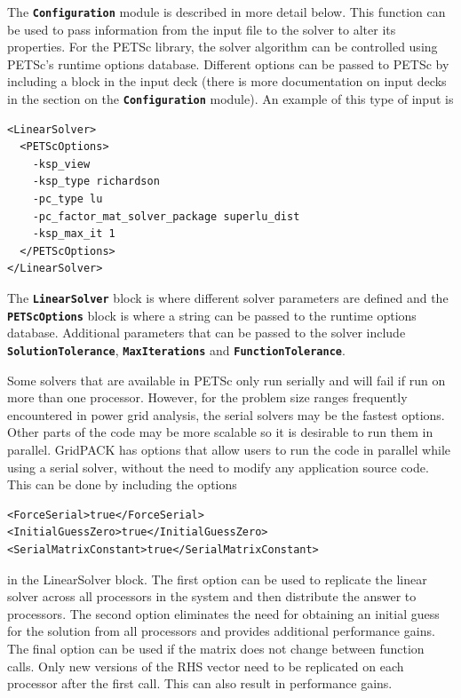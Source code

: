 \documentclass[12pt]{report} %
\begin{document}
The \texttt{\textbf{Configuration}} module is described in more detail below. This function can be used to pass information from the input file to the solver to alter its properties. For the PETSc library, the solver algorithm can be controlled using PETSc's runtime options database. Different options can be passed to PETSc by including a block in the input deck (there is more documentation on input decks in the section on the \texttt{\textbf{Configuration}} module). An example of this type of input is

{
\color{blue}
\begin{Verbatim}[fontseries=b]
<LinearSolver>
  <PETScOptions>
    -ksp_view
    -ksp_type richardson
    -pc_type lu
    -pc_factor_mat_solver_package superlu_dist
    -ksp_max_it 1
  </PETScOptions>
</LinearSolver>
\end{Verbatim}
}

The \texttt{\textbf{LinearSolver}} block is where different solver parameters are defined and the \texttt{\textbf{PETScOptions}} block is where a string can be passed to the runtime options database. Additional parameters that can be passed to the solver include \texttt{\textbf{SolutionTolerance}}, \texttt{\textbf{MaxIterations}} and \texttt{\textbf{FunctionTolerance}}. 

Some solvers that are available in PETSc only run serially and will fail if run on more than one processor. However, for the problem size ranges frequently encountered in power grid analysis, the serial solvers may be the fastest options. Other parts of the code may be more scalable so it is desirable to run them in parallel. GridPACK has options that allow users to run the code in parallel while using a serial solver, without the need to modify any application source code. This can be done by including the options

{
\color{blue}
\begin{Verbatim}[fontseries=b]
<ForceSerial>true</ForceSerial>
<InitialGuessZero>true</InitialGuessZero>
<SerialMatrixConstant>true</SerialMatrixConstant>
\end{Verbatim}
}

in the LinearSolver block. The first option can be used to replicate the linear solver across all processors in the system and then distribute the answer to processors. The second option eliminates the need for obtaining an initial guess for the solution from all processors and provides additional performance gains. The final option can be used if the matrix does not change between function calls. Only new versions of the RHS vector need to be replicated on each processor after the first call. This can also result in performance gains.
\end{document}
